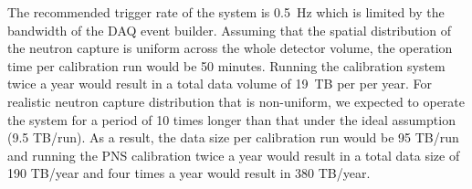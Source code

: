 The recommended trigger rate of the  system is \SI{0.5}{\hertz} which is limited by the bandwidth of the DAQ event builder. Assuming that the spatial distribution of the neutron capture is uniform across the whole detector volume, the operation time per calibration run would be \num{50} minutes.   
Running the  calibration system twice a year would result in a total data volume of \SI{19}{TB} per \nominalmodsize per year. 
For realistic neutron capture distribution that is non-uniform, we expected to operate the  system for a period of 10 times longer than that under the ideal assumption (9.5 TB/run). As a result, the data size per calibration run would be 95 TB/run and running the PNS calibration twice a year would result in a total data size of 190 TB/year and four times a year would result in 380 TB/year.